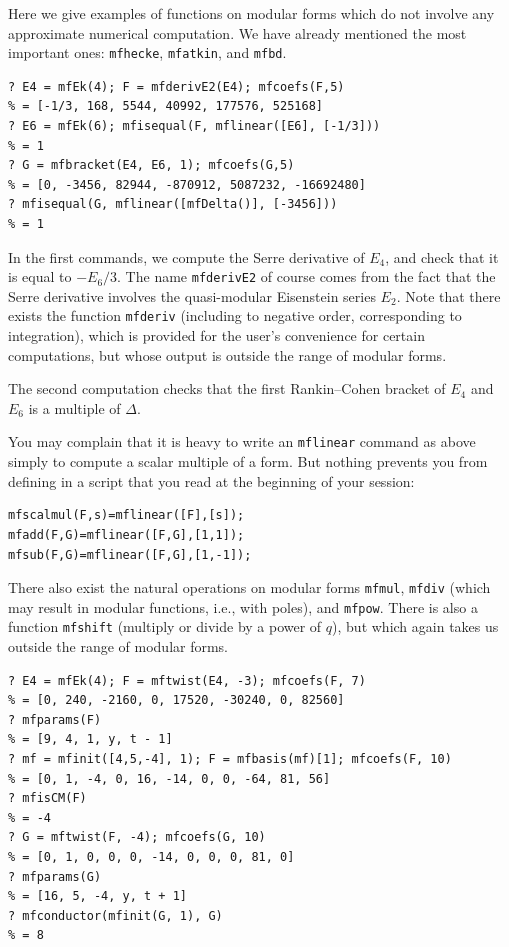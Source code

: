 \documentclass[11pt]{article}
\def\kbd#1{{\tt #1}}
\begin{document}
Here we give examples of functions on modular forms which do not involve
any approximate numerical computation. We have already mentioned the most
important ones: \kbd{mfhecke}, \kbd{mfatkin}, and \kbd{mfbd}.

\begin{verbatim}
? E4 = mfEk(4); F = mfderivE2(E4); mfcoefs(F,5)
% = [-1/3, 168, 5544, 40992, 177576, 525168]
? E6 = mfEk(6); mfisequal(F, mflinear([E6], [-1/3]))
% = 1
? G = mfbracket(E4, E6, 1); mfcoefs(G,5)
% = [0, -3456, 82944, -870912, 5087232, -16692480]
? mfisequal(G, mflinear([mfDelta()], [-3456]))
% = 1
\end{verbatim}

\medskip

In the first commands, we compute the Serre derivative of $E_4$, and
check that it is equal to $-E_6/3$. The name \kbd{mfderivE2} of course
comes from the fact that the Serre derivative involves the quasi-modular
Eisenstein series $E_2$. Note that there exists the function \kbd{mfderiv}
(including to negative order, corresponding to integration), which is
provided for the user's convenience for certain computations, but whose
output is outside the range of modular forms.

The second computation checks that the first Rankin--Cohen bracket of
$E_4$ and $E_6$ is a multiple of $\Delta$.

You may complain that it is heavy to write an \kbd{mflinear} command as above
simply to compute a scalar multiple of a form. But nothing prevents you from
defining in a script that you read at the beginning of your session:

\begin{verbatim}
mfscalmul(F,s)=mflinear([F],[s]);
mfadd(F,G)=mflinear([F,G],[1,1]);
mfsub(F,G)=mflinear([F,G],[1,-1]);
\end{verbatim}

There also exist the natural operations on modular forms \kbd{mfmul},
\kbd{mfdiv} (which may result in modular functions, i.e., with poles),
and \kbd{mfpow}. There is also a function \kbd{mfshift} (multiply or divide
by a power of $q$), but which again takes us outside the range of modular
forms.

\begin{verbatim}
? E4 = mfEk(4); F = mftwist(E4, -3); mfcoefs(F, 7)
% = [0, 240, -2160, 0, 17520, -30240, 0, 82560]
? mfparams(F)
% = [9, 4, 1, y, t - 1]
? mf = mfinit([4,5,-4], 1); F = mfbasis(mf)[1]; mfcoefs(F, 10)
% = [0, 1, -4, 0, 16, -14, 0, 0, -64, 81, 56]
? mfisCM(F)
% = -4
? G = mftwist(F, -4); mfcoefs(G, 10)
% = [0, 1, 0, 0, 0, -14, 0, 0, 0, 81, 0]
? mfparams(G)
% = [16, 5, -4, y, t + 1]
? mfconductor(mfinit(G, 1), G)
% = 8
\end{verbatim}
\end{document}
